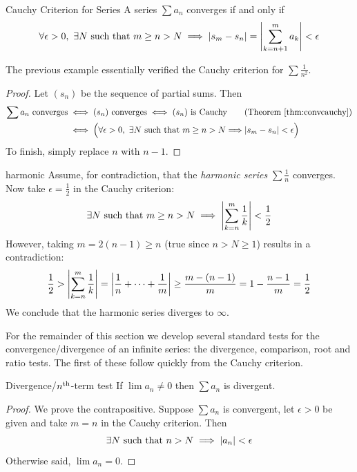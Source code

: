 \begin{thm}{Cauchy Criterion for Series}{}
	A series $\sum a_n$ converges if and only if
	\[
		\forall\epsilon>0,\ \exists N\text{ such that }m\ge n>N
		\implies\left| s_m-s_{n}\right|=\left| \sum_{k=n+1}^ma_k\right|<\epsilon
	\]
\end{thm}

The previous example essentially verified the Cauchy criterion for $\sum\frac 1{n^2}$.

\begin{proof}
	Let $(s_n)$ be the sequence of partial sums. Then
	\begin{align*}
		\sum a_n\text{ converges}
		&\iff (s_n)\text{ converges} 
		\iff (s_n)\text{ is Cauchy} 
		\tag{Theorem \ref{thm:convcauchy}}\\
		&\iff \Bigl(\forall\epsilon>0,\ \exists N\text{ such that }m\ge n>N
		\Longrightarrow\nm{s_m-s_n}<\epsilon\Bigr)
	\end{align*}
	To finish, simply replace $n$ with $n-1$. 
\end{proof}

\begin{example}{}{harmonic}
	Assume, for contradiction, that the \emph{harmonic series} $\sum\frac 1n$ converges. Now take $\epsilon=\frac 12$ in the Cauchy criterion:
	\[
		\exists N\text{ such that }m\ge n>N\implies \left| \sum_{k=n}^{m}\frac 1k\right|<\frac 12
	\]
	However, taking $m=2(n-1)\ge n$ (true since $n>N\ge 1$) results in a contradiction: 
	\[
		\frac 12>\left| \sum_{k=n}^{m}\frac 1k\right|=\left| \frac 1n+\cdots+\frac 1m\right|\ge \frac{m-(n-1)}{m}=1-\frac{n-1}m=\frac 12
	\]
	We conclude that the harmonic series diverges to $\infty$.
\end{example}

\goodbreak



For the remainder of this section we develop several standard tests for the convergence/divergence of an infinite series: the divergence, comparison, root and ratio tests. The first of these follow quickly from the Cauchy criterion.

\begin{thm}{Divergence/$n\textsuperscript{th}$-term test}{}
	If $\lim a_n\neq 0$ then $\sum a_n$ is divergent.
\end{thm}

\begin{proof}
	We prove the contrapositive. Suppose $\sum a_n$ is convergent, let $\epsilon>0$ be given and take $m=n$ in the Cauchy criterion. Then
	\[\exists N\text{ such that }n>N\implies\left| a_n\right|<\epsilon\]
	Otherwise said, $\lim a_n=0$.
\end{proof}


